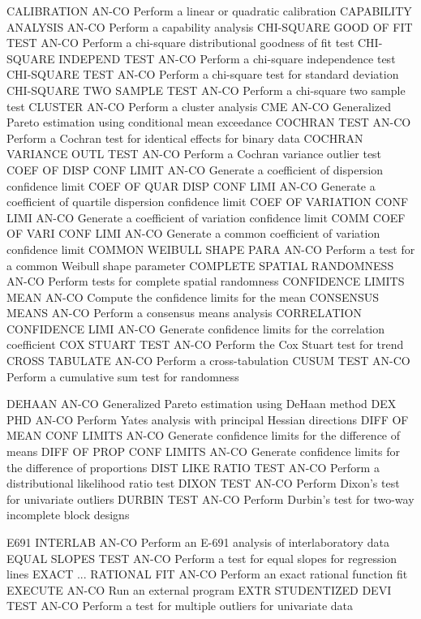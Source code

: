 CALIBRATION                 AN-CO Perform a linear or quadratic calibration
CAPABILITY ANALYSIS         AN-CO Perform a capability analysis
CHI-SQUARE GOOD OF FIT TEST AN-CO Perform a chi-square distributional goodness of fit test
CHI-SQUARE INDEPEND TEST    AN-CO Perform a chi-square independence test
CHI-SQUARE TEST             AN-CO Perform a chi-square test for standard deviation
CHI-SQUARE TWO SAMPLE TEST  AN-CO Perform a chi-square two sample test
CLUSTER                     AN-CO Perform a cluster analysis
CME                         AN-CO Generalized Pareto estimation using conditional mean exceedance
COCHRAN TEST                AN-CO Perform a Cochran test for identical effects for binary data
COCHRAN VARIANCE OUTL TEST  AN-CO Perform a Cochran variance outlier test
COEF OF DISP CONF LIMIT     AN-CO Generate a coefficient of dispersion confidence limit
COEF OF QUAR DISP CONF LIMI AN-CO Generate a coefficient of quartile dispersion confidence limit
COEF OF VARIATION CONF LIMI AN-CO Generate a coefficient of variation confidence limit
COMM COEF OF VARI CONF LIMI AN-CO Generate a common coefficient of variation confidence limit
COMMON WEIBULL SHAPE PARA   AN-CO Perform a test for a common Weibull shape parameter
COMPLETE SPATIAL RANDOMNESS AN-CO Perform tests for complete spatial randomness
CONFIDENCE LIMITS MEAN      AN-CO Compute the confidence limits for the mean
CONSENSUS MEANS             AN-CO Perform a consensus means analysis
CORRELATION CONFIDENCE LIMI AN-CO Generate confidence limits for the correlation coefficient
COX STUART TEST             AN-CO Perform the Cox Stuart test for trend
CROSS TABULATE              AN-CO Perform a cross-tabulation
CUSUM TEST                  AN-CO Perform a cumulative sum test for randomness

DEHAAN                      AN-CO Generalized Pareto estimation using DeHaan method
DEX PHD                     AN-CO Perform Yates analysis with principal Hessian directions
DIFF OF MEAN CONF LIMITS    AN-CO Generate confidence limits for the difference of means
DIFF OF PROP CONF LIMITS    AN-CO Generate confidence limits for the difference of proportions
DIST LIKE RATIO TEST        AN-CO Perform a distributional likelihood ratio test
DIXON TEST                  AN-CO Perform Dixon's test for univariate outliers
DURBIN TEST                 AN-CO Perform Durbin's test for two-way incomplete block designs

E691 INTERLAB               AN-CO Perform an E-691 analysis of interlaboratory data
EQUAL SLOPES TEST           AN-CO Perform a test for equal slopes for regression lines
EXACT ... RATIONAL FIT      AN-CO Perform an exact rational function fit
EXECUTE                     AN-CO Run an external program
EXTR STUDENTIZED DEVI TEST  AN-CO Perform a test for multiple outliers for univariate data

